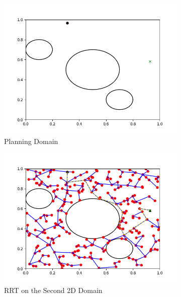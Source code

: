\documentclass{article}
\begin{document}
\begin{enumerate}[(a)]
\begin{figure}[h!]
    \centering
    \begin{subfigure}{0.3\textwidth}
		\centering
		\includegraphics[width=\textwidth]{../figures/rrt_star_run2-empty.png}
		\caption{Planning Domain}
	\end{subfigure}
    \hspace{0.05in}
    \begin{subfigure}{0.3\textwidth}
        \centering
        \includegraphics[width=\textwidth]{../figures/rrt_comparison_run2.png}
        \caption{RRT on the Second 2D Domain}
    \end{subfigure}
    \hspace{0.05in}
    \begin{subfigure}{0.3\textwidth}

\end{subfigure}
\end{figure}
\end{enumerate}
\end{document}
